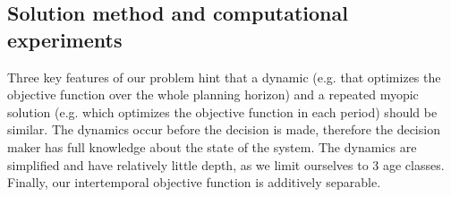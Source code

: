 
\clearpage
\subsection{Solution method and computational experiments}

Three key features of our problem hint that a dynamic (e.g. that optimizes the objective function over the whole planning horizon) and a repeated myopic solution (e.g. which optimizes the objective function in each period)  should be similar. The dynamics occur before the decision is made, therefore the decision maker has full knowledge about the state of the system. The dynamics are simplified and have relatively little depth, as we limit ourselves to 3 age classes. Finally, our intertemporal objective function is additively separable.

